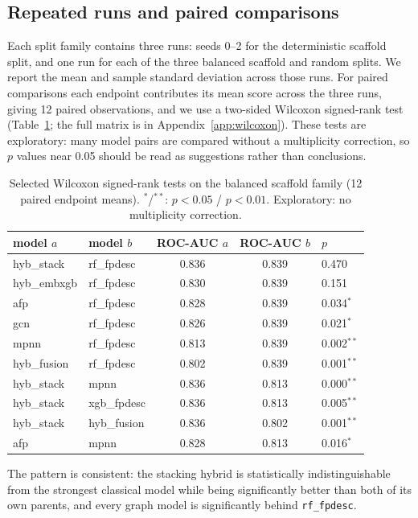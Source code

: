 \documentclass[conference]{IEEEtran}
\newcommand{\code}[1]{\texttt{\small #1}}
\begin{document}
\subsection{Repeated runs and paired comparisons}
Each split family contains three runs: seeds 0--2 for the deterministic scaffold split, and one
run for each of the three balanced scaffold and random splits. We report the mean and sample
standard deviation across those runs. For paired comparisons each endpoint contributes its mean
score across the three runs, giving 12 paired observations, and we use a two-sided Wilcoxon
signed-rank test (Table~\ref{tab:wilcoxon-short}; the full matrix is in
Appendix~\ref{app:wilcoxon}). These tests are exploratory: many model pairs are compared without
a multiplicity correction, so $p$ values near 0.05 should be read as suggestions rather than
conclusions.

\begin{table}[t]
\centering
\caption{Selected Wilcoxon signed-rank tests on the balanced scaffold family (12 paired endpoint
means). $^{*}$/$^{**}$: $p<0.05$ / $p<0.01$. Exploratory: no multiplicity correction.}
\label{tab:wilcoxon-short}
\small
\begin{tabular}{llccl}
\toprule
model $a$ & model $b$ & ROC-AUC $a$ & ROC-AUC $b$ & $p$ \\
\midrule
hyb\_stack & rf\_fpdesc & 0.836 & 0.839 & 0.470 \\
hyb\_embxgb & rf\_fpdesc & 0.830 & 0.839 & 0.151 \\
afp & rf\_fpdesc & 0.828 & 0.839 & 0.034$^{*}$ \\
gcn & rf\_fpdesc & 0.826 & 0.839 & 0.021$^{*}$ \\
mpnn & rf\_fpdesc & 0.813 & 0.839 & 0.002$^{**}$ \\
hyb\_fusion & rf\_fpdesc & 0.802 & 0.839 & 0.001$^{**}$ \\
\midrule
hyb\_stack & mpnn & 0.836 & 0.813 & 0.000$^{**}$ \\
hyb\_stack & xgb\_fpdesc & 0.836 & 0.813 & 0.005$^{**}$ \\
hyb\_stack & hyb\_fusion & 0.836 & 0.802 & 0.001$^{**}$ \\
afp & mpnn & 0.828 & 0.813 & 0.016$^{*}$ \\
\bottomrule
\end{tabular}
\end{table}

The pattern is consistent: the stacking hybrid is statistically indistinguishable from the
strongest classical model while being significantly better than both of its own parents, and
every graph model is significantly behind \code{rf\_fpdesc}.
\end{document}
